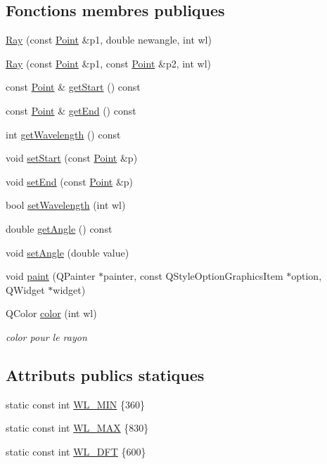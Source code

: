 \subsection*{Fonctions membres publiques}
\begin{DoxyCompactItemize}
\item 
\mbox{\hyperlink{class_ray_ab5bebf320c79990d5d729d36f798b542}{Ray}} (const \mbox{\hyperlink{class_point}{Point}} \&p1, double newangle, int wl)
\item 
\mbox{\hyperlink{class_ray_ad9524414a8c37bbc36a245d7296d847e}{Ray}} (const \mbox{\hyperlink{class_point}{Point}} \&p1, const \mbox{\hyperlink{class_point}{Point}} \&p2, int wl)
\item 
const \mbox{\hyperlink{class_point}{Point}} \& \mbox{\hyperlink{class_ray_aa897fef03c37b10770dbb5c720af85bb}{get\+Start}} () const
\item 
const \mbox{\hyperlink{class_point}{Point}} \& \mbox{\hyperlink{class_ray_a5ad0bb5d3a14e9425dfd6b4d653604bd}{get\+End}} () const
\item 
int \mbox{\hyperlink{class_ray_a3845823be5c71f987055dd1798f076e2}{get\+Wavelength}} () const
\item 
void \mbox{\hyperlink{class_ray_a9027a6d6c2929529399717932532ce25}{set\+Start}} (const \mbox{\hyperlink{class_point}{Point}} \&p)
\item 
void \mbox{\hyperlink{class_ray_aa6637463a3ea6b87462ec81dcf78ae70}{set\+End}} (const \mbox{\hyperlink{class_point}{Point}} \&p)
\item 
bool \mbox{\hyperlink{class_ray_aaa0641bb04b0e2805f21b1788c5e3600}{set\+Wavelength}} (int wl)
\item 
double \mbox{\hyperlink{class_ray_aa5c3f9746583b826471f3414af98eb09}{get\+Angle}} () const
\item 
void \mbox{\hyperlink{class_ray_ad8d03123d17449cb841b826c43e65095}{set\+Angle}} (double value)
\item 
void \mbox{\hyperlink{class_ray_a99984bfcce5309fa5ed3d0be6a869c1a}{paint}} (Q\+Painter $\ast$painter, const Q\+Style\+Option\+Graphics\+Item $\ast$option, Q\+Widget $\ast$widget)
\item 
Q\+Color \mbox{\hyperlink{class_ray_aeb367fb257c5bb4ee896b41d9194e585}{color}} (int wl)
\begin{DoxyCompactList}\small\item\em color pour le rayon \end{DoxyCompactList}\end{DoxyCompactItemize}
\subsection*{Attributs publics statiques}
\begin{DoxyCompactItemize}
\item 
static const int \mbox{\hyperlink{class_ray_a478177dabc9f1a3a0ba7d8b388a58b7e}{W\+L\+\_\+\+M\+IN}} \{360\}
\item 
static const int \mbox{\hyperlink{class_ray_add278b4978966f54e3c22e8be2224b7f}{W\+L\+\_\+\+M\+AX}} \{830\}
\item 
static const int \mbox{\hyperlink{class_ray_af4176c69ef62ea83bf84b40d7e1c5560}{W\+L\+\_\+\+D\+FT}} \{600\}
\end{DoxyCompactItemize}
